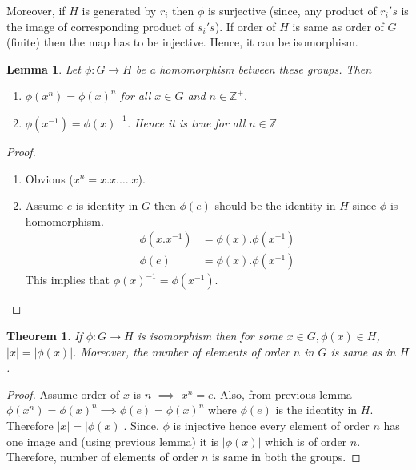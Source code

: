 \documentclass[12pt]{report}
\newtheorem{thm}{Theorem}
\newtheorem{lem}{Lemma}
\begin{document}
Moreover, if $H$ is generated by $r_i$ then $\phi$ is surjective (since, any product of $r_i's$ is the image of corresponding product of $s_i's$). If order of $H$ is same as order of $G$ (finite) then the map has to be injective. Hence, it can be isomorphism.
\begin{lem}
    Let $\phi:G \to H$ be a homomorphism between these groups. Then
    \begin{enumerate}
        \item $\phi(x^n) = \phi(x)^n$ for all $x \in G$ and $n \in \mathbb{Z}^+$.
        \item $\phi(x^{-1}) = \phi(x)^{-1}$. Hence it is true for all $n \in \mathbb{Z}$
    \end{enumerate}
\end{lem}
\begin{proof}
    \begin{enumerate}
        \item Obvious ($x^n = x.x.\dots.x$).
        \item Assume $e$ is identity in $G$ then $\phi(e)$ should be the identity in $H$ since $\phi$ is homomorphism. 
        \begin{align*}
            \phi(x.x^{-1}) &= \phi(x).\phi(x^{-1})\\
            \phi(e) &= \phi(x).\phi(x^{-1})
        \end{align*}
        This implies that $\phi(x)^{-1} = \phi(x^{-1})$.
    \end{enumerate}
\end{proof}
\begin{thm}
    If $\phi: G \to H$ is isomorphism then for some $x \in G, \phi(x) \in H$, $|x| = |\phi(x)|$. Moreover, the number of elements of order $n$ in $G$ is same as in $H$.
\end{thm}
\begin{proof}
    Assume order of $x$ is $n$ $\implies$ $x^n = e$. Also, from previous lemma $\phi(x^n) = \phi(x)^n \implies \phi(e) = \phi(x)^n$ where $\phi(e)$ is the identity in $H$. Therefore $|x| = |\phi(x)|$. Since, $\phi$ is injective hence every element of order $n$ has one image and (using previous lemma) it is $|\phi(x)|$ which is of order $n$. Therefore, number of elements of order $n$ is same in both the groups.
\end{proof}
\end{document}
